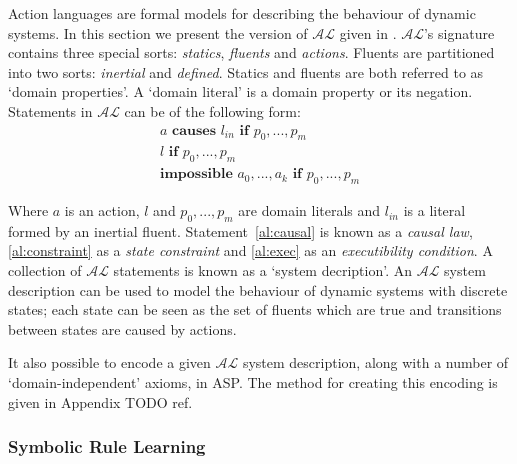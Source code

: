 \documentclass[../interim.tex]{subfiles}
\begin{document}
Action languages are formal models for describing the behaviour of dynamic systems. In this section we present the version of $\mathcal{AL}$ given in \cite{krr-asp-book}. $\mathcal{AL}$'s signature contains three special sorts: \textit{statics}, \textit{fluents} and \textit{actions}. Fluents are partitioned into two sorts: \textit{inertial} and \textit{defined}. Statics and fluents are both referred to as `domain properties'. A `domain literal' is a domain property or its negation. Statements in $\mathcal{AL}$ can be of the following form:
\begin{gather}
  a \textbf{ causes } l_{in} \textbf{ if } p_0,...,p_m \label{al:causal} \\
  l \textbf{ if } p_0,...,p_m \label{al:constraint} \\
  \textbf{impossible } a_0,...,a_k \textbf{ if } p_0,...,p_m \label{al:exec}
\end{gather}

Where $a$ is an action, $l$ and $p_0,...,p_m$ are domain literals and $l_{in}$ is a literal formed by an inertial fluent. Statement~\ref{al:causal} is known as a \textit{causal law}, \ref{al:constraint} as a \textit{state constraint} and \ref{al:exec} as an \textit{executibility condition}. A collection of $\mathcal{AL}$ statements is known as a `system decription'. An $\mathcal{AL}$ system description can be used to model the behaviour of dynamic systems with discrete states; each state can be seen as the set of fluents which are true and transitions between states are caused by actions.

It also possible to encode a given $\mathcal{AL}$ system description, along with a number of `domain-independent' axioms, in ASP. The method for creating this encoding is given in Appendix TODO ref. %

\subsubsection{Symbolic Rule Learning}
\end{document}
